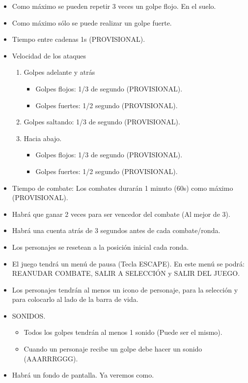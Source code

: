 \documentclass[10pt,a4paper,titlepage]{article}
\begin{document}
\begin{itemize}
	\item Como máximo se pueden repetir 3 veces un golpe flojo. En el suelo.
	\item Como máximo sólo se puede realizar un golpe fuerte.
	\item Tiempo entre cadenas 1s (PROVISIONAL).

	\item Velocidad de los ataques
	\begin{enumerate}
		\item Golpes adelante y atrás
		\begin{itemize}
			\item Golpes flojos: 1/3 de segundo (PROVISIONAL). 
			\item Golpes fuertes: 1/2 segundo (PROVISIONAL).
		\end{itemize}
		\item Golpes saltando: 1/3 de segundo (PROVISIONAL).

		\item Hacia abajo.
		\begin{itemize}
			\item Golpes flojos: 1/3 de segundo (PROVISIONAL). 
			\item Golpes fuertes: 1/2 segundo (PROVISIONAL).
		\end{itemize}
	\end{enumerate}

	\item Tiempo de combate: Los combates durarán 1 minuto (60s) como máximo (PROVISIONAL).
	\item Habrá que ganar 2 veces para ser vencedor del combate (Al mejor de 3).
	\item Habrá una cuenta atrás de 3 segundos antes de cada combate/ronda.
	\item Los personajes se resetean a la posición inicial cada ronda.
	\item El juego tendrá un menú de pausa (Tecla ESCAPE). En este menú se podrá: REANUDAR COMBATE, SALIR A SELECCIÓN y SALIR DEL JUEGO.
	\item Los personajes tendrán al menos un icono de personaje, para la selección y para colocarlo al lado de la barra de vida.
	\item SONIDOS.
	\begin{itemize}
		\item Todos los golpes tendrán al menos 1 sonido (Puede ser el mismo).
		\item Cuando un personaje recibe un golpe debe hacer un sonido (AAARRRGGG).
	\end{itemize}

	\item Habrá un fondo de pantalla. Ya veremos como.
\end{itemize}
\end{document}

